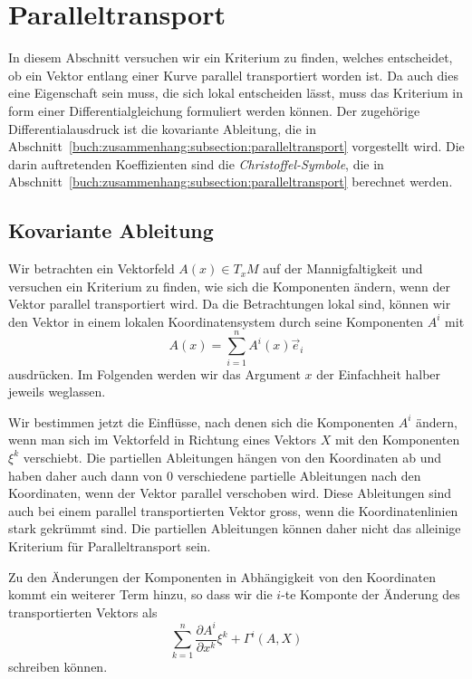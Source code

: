 %
%
%

%
%
\section{Paralleltransport
\label{buch:zusammenhang:section:paralleltransport}}
In diesem Abschnitt versuchen wir ein Kriterium zu finden, welches
entscheidet, ob ein Vektor entlang einer Kurve parallel transportiert
worden ist.
Da auch dies eine Eigenschaft sein muss, die sich lokal entscheiden
lässt, muss das Kriterium in form einer Differentialgleichung
formuliert werden können.
Der zugehörige Differentialausdruck ist die kovariante Ableitung,
die in Abschnitt~\ref{buch:zusammenhang:subsection:paralleltransport}
vorgestellt wird.
Die darin auftretenden Koeffizienten sind die {\em Christoffel-Symbole},
die in Abschnitt~\ref{buch:zusammenhang:subsection:paralleltransport}
berechnet werden.

%
%
\subsection{Kovariante Ableitung
\label{buch:zusammenhang:subsection:paralleltransport}}
Wir betrachten ein Vektorfeld $A(x)\in T_xM$ auf der Mannigfaltigkeit 
und versuchen ein Kriterium zu finden, wie sich die Komponenten
ändern, wenn der Vektor parallel transportiert wird.
Da die Betrachtungen lokal sind, können wir den Vektor in einem
lokalen Koordinatensystem durch seine Komponenten $A^i$ mit
\[
A(x) = \sum_{i=1}^n A^i(x)\vec{e}_i
\]
ausdrücken.
Im Folgenden werden wir das Argument $x$ der Einfachheit halber
jeweils weglassen.

Wir bestimmen jetzt die Einflüsse, nach denen sich die Komponenten
$A^i$ ändern, wenn man sich im Vektorfeld in Richtung eines
Vektors $X$ mit den Komponenten $\xi^k$ verschiebt.
Die partiellen Ableitungen hängen von den Koordinaten ab und haben
daher auch dann von $0$ verschiedene partielle Ableitungen nach
den Koordinaten, wenn der Vektor parallel verschoben wird.
Diese Ableitungen sind auch bei einem parallel transportierten
Vektor gross, wenn die Koordinatenlinien stark gekrümmt sind.
Die partiellen Ableitungen können daher nicht das alleinige Kriterium
für Paralleltransport sein.

Zu den Änderungen der Komponenten in Abhängigkeit von den Koordinaten
kommt ein weiterer Term hinzu, so dass wir die $i$-te Komponte der Änderung
des transportierten Vektors als
\begin{equation}
\sum_{k=1}^n
\frac{\partial A^i}{\partial x^k}
\xi^k
+
\Gamma^i(A,X)
\label{buch:zusammenhang:paralleltransport:eqn:kovabl}
\end{equation}
schreiben können.

